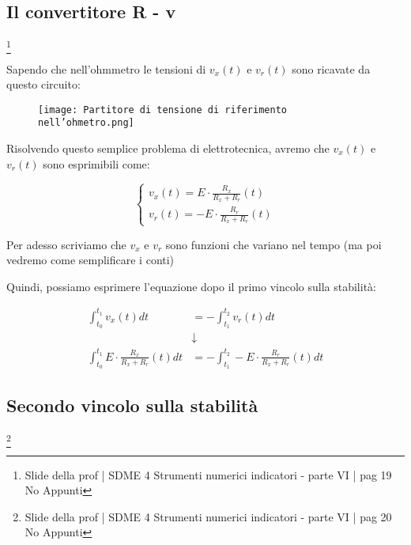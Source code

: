 \newpage 

\subsection{Il convertitore R - v}
\footnote{Slide della prof | SDME 4 Strumenti numerici indicatori - parte VI | pag 19 \\  
No Appunti }

Sapendo che nell'ohmmetro le tensioni di $v_x (t)$ e $v_r (t)$ sono ricavate da questo circuito: 

\begin{figure}[h]
    \centering
    \texttt{[image: Partitore di tensione di riferimento nell'ohmetro.png]}
\end{figure}

Risolvendo questo semplice problema di elettrotecnica, avremo che $v_x(t)$ e $v_r (t)$ sono esprimibili come:

{
    \Large 
    \begin{equation}
        \begin{cases}
            v_x (t) = E \cdot \frac{R_x}{R_x + R_r} (t)
            \\
            v_r (t) = - E \cdot \frac{R_r}{R_x + R_r} (t)
        \end{cases}
    \end{equation}
}

\begin{tcolorbox}
Per adesso scriviamo che $v_x$ e $v_r$ sono funzioni che variano nel tempo (ma poi vedremo come semplificare i conti)
\end{tcolorbox} 

Quindi, possiamo esprimere l'equazione dopo il primo vincolo sulla stabilità: 

{
    \Large 
    \begin{equation}
        \begin{split}
        \int_{t_0}^{t_1} v_x (t) dt 
        &= 
        - 
        \int_{t_1}^{t_2} v_r (t) dt   
        \\
        &\downarrow
        \\
        \int_{t_0}^{t_1} 
        E \cdot \frac{R_x}{R_x + R_r} (t)
        dt 
        &= 
        - 
        \int_{t_1}^{t_2} 
        - E \cdot \frac{R_r}{R_x + R_r} (t)
        dt  
        \end{split}
    \end{equation}
}

\newpage 

\subsection{Secondo vincolo sulla stabilità}
\footnote{Slide della prof | SDME 4 Strumenti numerici indicatori - parte VI | pag 20 \\  
No Appunti }

